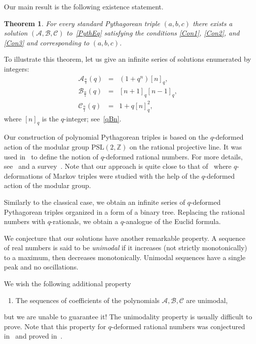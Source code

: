 \documentclass{article}[12pt]
\theoremstyle{plain}
\newtheorem{thm}{Theorem}
\theoremstyle{definition}
\newcommand{\Z}{\mathbb{Z}}
\newcommand{\A}{\mathcal{A}}
\newcommand{\B}{\mathcal{B}}
\newcommand{\cC}{\mathcal{C}}
\newcommand{\PSL}{\mathrm{PSL}}
\begin{document}
Our main result is the following existence statement.

\begin{thm}
\label{ExtUniq}
For every standard Pythagorean triple $(a,b,c)$
there exists a solution $(\A,\B,\cC)$ to~\eqref{PythEq}
satisfying the conditions \ref{Con1}, \ref{Con2}, and \ref{Con3}
and corresponding to $(a,b,c)$.
\end{thm}

To illustrate this theorem, let us give an infinite
  series of solutions enumerated by integers:
\begin{eqnarray*}
\A_{\frac{n}{1}}(q)&=&
(1+q^n)\left[n\right]_q,
\\[4pt]
\B_{\frac{n}{1}}(q)&=&
\left[n+1\right]_q\left[n-1\right]_q,
\\[4pt]
\cC_{\frac{n}{1}}(q)&=&
1+q\left[n\right]_q^2,
\end{eqnarray*}
where $\left[n\right]_q$ is the $q$-integer; see~\eqref{qBn}.

Our construction of polynomial Pythagorean triples is based on
the $q$-deformed action of the modular group $\PSL(2,\Z)$ on the rational projective line.
It was used in~\cite{MGOfmsigma} to define the notion of $q$-deformed rational numbers.
For more details, see~\cite{LMGadv} and  a survey~\cite{MGOmn}.
Note that our approach is quite close to that of~\cite{EJMGO}
where $q$-deformations of Markov triples were studied with the help of
the $q$-deformed action of the modular group.

Similarly to the classical case,
we obtain an infinite series of $q$-deformed Pythagorean triples
organized in a form of a binary tree.
Replacing the rational numbers with
$q$-rationals, we obtain a $q$-analogue of the Euclid formula.

We conjecture that our solutions have another remarkable property.
A sequence of real numbers is said to be {\it unimodal}
if it increases (not strictly monotonically) to a maximum, then decreases monotonically.
Unimodal sequences have a single peak and no oscillations.

We wish the following additional property
\begin{enumerate}
\item[$4^*$.]
\label{Con4}
The  sequences of coefficients of the polynomials $\A,\B,\cC$ are unimodal,
\end{enumerate}
but we are unable to guarantee it!
The unimodality property is usually difficult to prove.
Note that this property for $q$-deformed rational numbers
was conjectured in~\cite{MGOfmsigma} and proved in~\cite{OgRa}.
\end{document}
